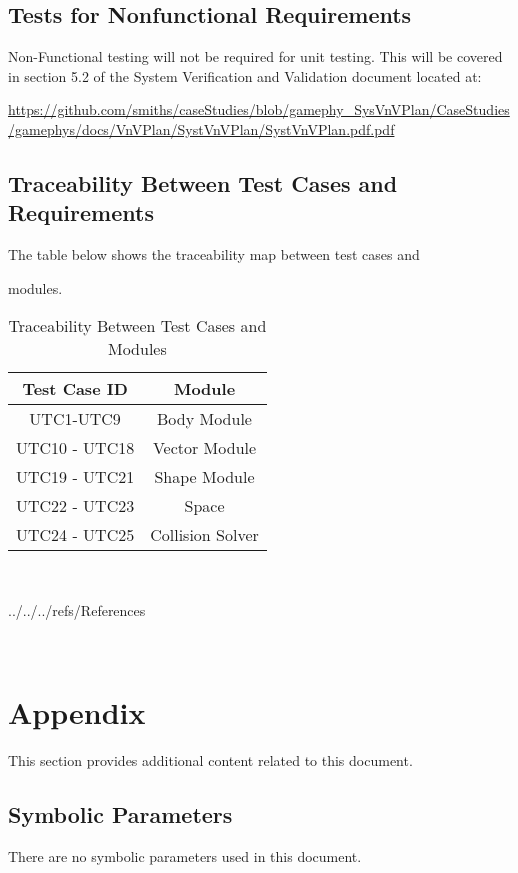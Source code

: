 \documentclass[12pt, titlepage]{article}
\begin{document}
\subsection{Tests for Nonfunctional Requirements}

Non-Functional testing will not be required for unit testing. This will be covered in section 5.2 of the System Verification and Validation document located at: 

\url{https://github.com/smiths/caseStudies/blob/gamephy_SysVnVPlan/CaseStudies/gamephys/docs/VnVPlan/SystVnVPlan/SystVnVPlan.pdf.pdf}

\subsection{Traceability Between Test Cases and Requirements}

The table below shows the traceability map between test cases and 

modules.

\begin{table} [h!]
	
	\centering
	
	\begin{tabular}{|c|c|}
		
		\hline	
		
		\textbf{Test Case ID} & \textbf{Module}\\
		
		\hline 
		
	
		UTC1-UTC9& Body Module\\ \hline
		
		UTC10 - UTC18& Vector  Module\\ \hline
		
		UTC19 - UTC21&  Shape Module\\ \hline
		
		UTC22 - UTC23& Space\\ \hline
		
		UTC24 - UTC25 & Collision Solver\\ \hline
		
	\end{tabular}
	
	\caption{Traceability Between Test Cases and Modules}
	
	\label{Table:Traceability} 
	
\end{table}

~\newpage


 {../../../refs/References}

~\newpage



\section{Appendix}



This section provides additional content related to this document.



\subsection{Symbolic Parameters}



There are no symbolic parameters used in this document.
\end{document}
